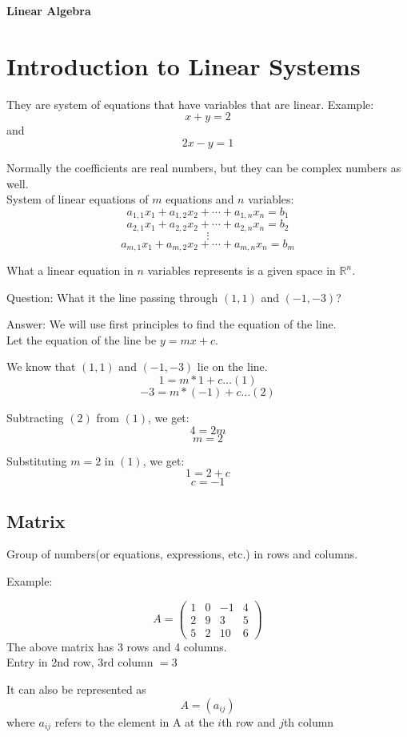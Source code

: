 \documentclass{article}
\begin{document}
\begin{center}
    \begin{LARGE}
        \textbf{Linear Algebra}
    \end{LARGE}
\end{center}

\section{Introduction to Linear Systems}
They are system of equations that have variables that are linear.
Example: $$x + y = 2$$ and $$2x - y = 1$$

Normally the coefficients are real numbers, but they can be complex numbers as well. \\[1pt]
System of linear equations of $m$ equations and $n$ variables:
    $$
    a_{1,1} x_1 + a_{1,2} x_2 + \cdots + a_{1,n} x_n = b_1
    $$
    $$
    a_{2,1} x_1 + a_{2,2} x_2 + \cdots + a_{2,n} x_n = b_2
    $$
    $$
    \vdots
    $$
    $$
    a_{m,1} x_1 + a_{m,2} x_2 + \cdots + a_{m,n} x_n = b_m
    $$

What a linear equation in $n$ variables represents is a given space in $\mathbb{R}^n$.

\begin{paragraph}{Question:}
What it the line passing through $(1,1)$ and $(-1,-3)$?
\end{paragraph}     
\begin{paragraph}{Answer:}
    We will use first principles to find the equation of the line.\\[1pt]
    Let the equation of the line be $y = mx + c$.
    
    We know that $(1,1)$ and $(-1,-3)$ lie on the line.\\[1pt]
    $$1 = m*1 + c \dots (1)$$
    $$-3 = m*(-1) + c \dots (2)$$

    Subtracting $(2)$ from $(1)$, we get:
    $$4 = 2m$$
    $$m = 2$$

    Substituting $m = 2$ in $(1)$, we get:
    $$1 = 2 + c$$
    $$c = -1$$
    
\end{paragraph}

\subsection*{Matrix}
Group of numbers(or equations, expressions, etc.) in rows and columns.
\begin{paragraph}{Example:}

    $$A = \begin{pmatrix}
        1 & 0 & -1 & 4 \\
        2 & 9 & 3 & 5 \\
        5 & 2 & 10 & 6 
    \end{pmatrix}$$
The above matrix has 3 rows and 4 columns.\\[1pt]
Entry in 2nd row, 3rd column $ = 3$

It can also be represented as $$A = (a_{ij})$$ 
where $a_{ij}$ refers to the element in A at the $i$th row and $j$th column

\end{paragraph}
\end{document}

